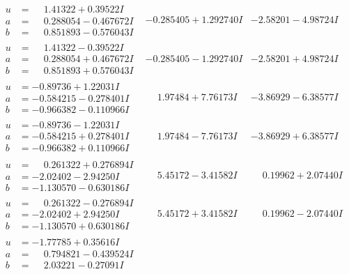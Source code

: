 \documentclass[1p]{elsarticle_modified}
\theoremstyle{definition}
\begin{document}
$$\begin{array}{c|c|c}
\begin{aligned}
u &= \phantom{-}1.41322 + 0.39522 I \\
a &= \phantom{-}0.288054 - 0.467672 I \\
b &= \phantom{-}0.851893 - 0.576043 I\end{aligned}
 & -0.285405 + 1.292740 I & -2.58201 - 4.98724 I \\ \hline\begin{aligned}
u &= \phantom{-}1.41322 - 0.39522 I \\
a &= \phantom{-}0.288054 + 0.467672 I \\
b &= \phantom{-}0.851893 + 0.576043 I\end{aligned}
 & -0.285405 - 1.292740 I & -2.58201 + 4.98724 I \\ \hline\begin{aligned}
u &= -0.89736 + 1.22031 I \\
a &= -0.584215 - 0.278401 I \\
b &= -0.966382 - 0.110966 I\end{aligned}
 & \phantom{-}1.97484 + 7.76173 I & -3.86929 - 6.38577 I \\ \hline\begin{aligned}
u &= -0.89736 - 1.22031 I \\
a &= -0.584215 + 0.278401 I \\
b &= -0.966382 + 0.110966 I\end{aligned}
 & \phantom{-}1.97484 - 7.76173 I & -3.86929 + 6.38577 I \\ \hline\begin{aligned}
u &= \phantom{-}0.261322 + 0.276894 I \\
a &= -2.02402 - 2.94250 I \\
b &= -1.130570 - 0.630186 I\end{aligned}
 & \phantom{-}5.45172 - 3.41582 I & \phantom{-}0.19962 + 2.07440 I \\ \hline\begin{aligned}
u &= \phantom{-}0.261322 - 0.276894 I \\
a &= -2.02402 + 2.94250 I \\
b &= -1.130570 + 0.630186 I\end{aligned}
 & \phantom{-}5.45172 + 3.41582 I & \phantom{-}0.19962 - 2.07440 I \\ \hline\begin{aligned}
u &= -1.77785 + 0.35616 I \\
a &= \phantom{-}0.794821 - 0.439524 I \\
b &= \phantom{-}2.03221 - 0.27091 I\end{aligned}

\end{array}$$
\end{document}

